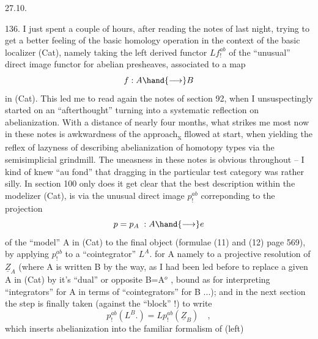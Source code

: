 
27.10.

136.    I just spent a couple of hours,  after reading the notes of last
night,  trying to get a better feeling of the basic homology operation
in the context of the basic localizer (Cat),  namely taking the left
derived functor  $Lf_!^{ab}$ of the ``unusual'' direct image functor for abelian
presheaves,  associated to a map
\[ f: A \hand{\longrightarrow} B \]
in (Cat).  This led me to read again the notes of section 92,  when I
unsuspectingly started on an ``afterthought''\hand{,}  turning into a systematic
reflection on abelianization.  With a distance of nearly four months,
what strikes me most now in these notes is awkwardness of the approach\textsubscript{x}
fllowed at start,  when yielding  the reflex of lazyness of describing
abelianization of homotopy types via the semisimplicial grindmill.  The
uneasness in these notes is obvious throughout  --  I kind of knew
``au fond'' that dragging in the particular test category \hand{$\Delta$} was rather
silly.  In section 100 only does it get clear that the best\hand{,}
description\hand{,} within the modelizer (Cat), is via the
unusual direct image $p_!^{ab}$ correponding to the projection
\[ p=p_A \; : A \hand{\longrightarrow} e \]
of the ``model'' A in (Cat) to the final object (formulae (11) and (12)
page 569),  by applying $p_!^{ab}$ to a ``cointegrator''  $L^{A}.$ for A  namely to a
projective resolution of  $\underline{Z}_A$  (where A is written B by the way,  as 
I had been led before to replace a given A in (Cat) by it's ``dual'' or
opposite B=A$^{o}$ ,  bound as   for interpreting ``integrators'' for A
in terms of ``cointegrators'' for B ...);  and in the next section the
step is finally taken (against the ``block'' !)  to write
\[ p_!^{ab}(L^{B}.) = Lp_!^{ab}(\underline{Z}_B) \quad , \]
which inserts abelianization into the familiar formalism of (left)

